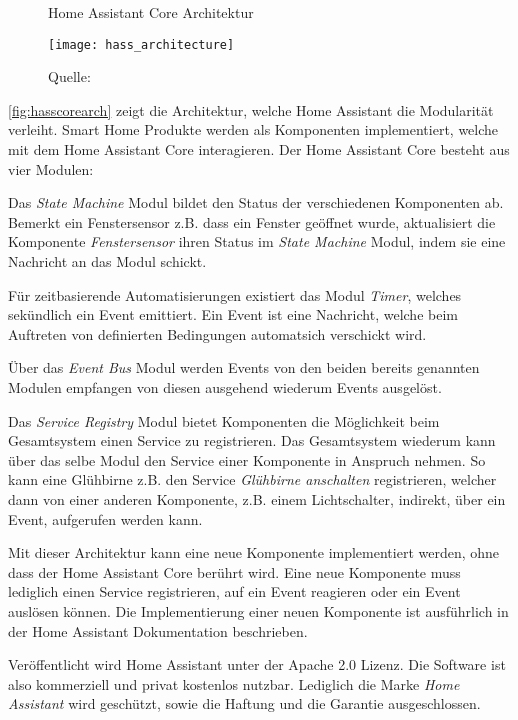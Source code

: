 \begin{figure}[ht]
	\centering
	\caption{Home Assistant Core Architektur}
	\texttt{[image: hass\_architecture]}
	\caption*{\footnotesize{Quelle: }}
	\label{fig:hasscorearch}
\end{figure}

\autoref{fig:hasscorearch} zeigt die Architektur, welche Home Assistant die Modularität verleiht.
Smart Home Produkte werden als Komponenten implementiert, welche mit dem Home Assistant Core interagieren.
Der Home Assistant Core besteht aus vier Modulen:

Das \textit{State Machine} Modul bildet den Status der verschiedenen Komponenten ab.
Bemerkt ein Fenstersensor z.B. dass ein Fenster geöffnet wurde, aktualisiert die Komponente \textit{Fenstersensor} ihren Status im \textit{State Machine} Modul, indem sie eine Nachricht an das Modul schickt.

Für zeitbasierende Automatisierungen existiert das Modul \textit{Timer}, welches sekündlich ein Event emittiert.
Ein Event ist eine Nachricht, welche beim Auftreten von definierten Bedingungen automatsich verschickt wird.

Über das \textit{Event Bus} Modul werden Events von den beiden bereits genannten Modulen empfangen von diesen ausgehend wiederum Events ausgelöst.

Das \textit{Service Registry} Modul bietet Komponenten die Möglichkeit beim Gesamtsystem einen Service zu registrieren.
Das Gesamtsystem wiederum kann über das selbe Modul den Service einer Komponente in Anspruch nehmen.
So kann eine Glühbirne z.B. den Service \textit{Glühbirne anschalten} registrieren, welcher dann von einer anderen Komponente, z.B. einem Lichtschalter, indirekt, über ein Event, aufgerufen werden kann.

Mit dieser Architektur kann eine neue Komponente implementiert werden, ohne dass der Home Assistant Core berührt wird.
Eine neue Komponente muss lediglich einen Service registrieren, auf ein Event reagieren oder ein Event auslösen können.
Die Implementierung einer neuen Komponente ist ausführlich in der Home Assistant Dokumentation beschrieben.

Veröffentlicht wird Home Assistant unter der Apache 2.0 Lizenz.
Die Software ist also kommerziell und privat kostenlos nutzbar.
Lediglich die Marke \textit{Home Assistant} wird geschützt, sowie die Haftung und die Garantie ausgeschlossen.

